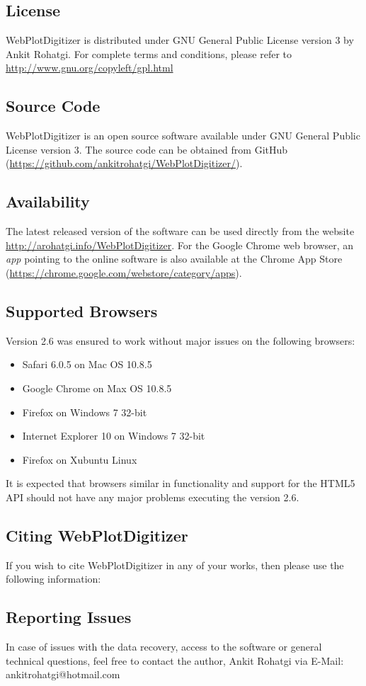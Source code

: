 \documentclass{article}
\begin{document}
\subsection{License}
WebPlotDigitizer is distributed under GNU General Public License version 3 by Ankit Rohatgi. For complete terms and conditions, please refer to \url{http://www.gnu.org/copyleft/gpl.html}
\subsection{Source Code}
WebPlotDigitizer is an open source software available under GNU General Public License version 3. The source code can be obtained from GitHub (\url{https://github.com/ankitrohatgi/WebPlotDigitizer/}).
\subsection{Availability}
The latest released version of the software can be used directly from the website \url{http://arohatgi.info/WebPlotDigitizer}. For the Google Chrome web browser, an \emph{app} pointing to the online software is also available at the Chrome App Store (\url{https://chrome.google.com/webstore/category/apps}).

\subsection{Supported Browsers}
Version 2.6 was ensured to work without major issues on the following browsers:
\begin{itemize}
\item{Safari 6.0.5 on Mac OS 10.8.5}
\item{Google Chrome on Max OS 10.8.5}
\item{Firefox on Windows 7 32-bit}
\item{Internet Explorer 10 on Windows 7 32-bit}
\item{Firefox on Xubuntu Linux}
\end{itemize}
It is expected that browsers similar in functionality and support for the HTML5 API should not have any major problems executing the version 2.6.

\subsection{Citing WebPlotDigitizer}
If you wish to cite WebPlotDigitizer in any of your works, then please use the following information:

\subsection{Reporting Issues}
In case of issues with the data recovery, access to the software or general technical questions, feel free to contact the author, Ankit Rohatgi via E-Mail: ankitrohatgi@hotmail.com
\end{document}
